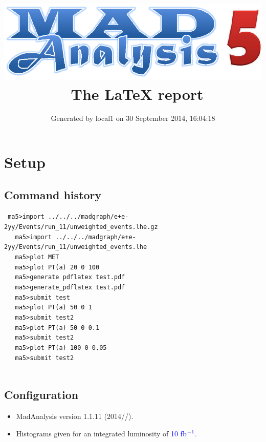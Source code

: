 \documentclass[a4paper, 11pt]{article}
\title{{\includegraphics[scale=.4]{logo.eps}}\ The LaTeX report}
\author{Generated by local1 on 30 September 2014, 16:04:18}
\begin{document}
\maketitle
\flushbottom

\newpage
\section{ Setup}

\subsection{ Command history}

\texttt{ ma5>import ../\-../\-../\-madgraph/\-e+e-2yy/\-Events/\-run\_11/\-unweighted\_events.lhe.gz\\
}
\texttt{ }\texttt{ }\texttt{ ma5>import ../\-../\-../\-madgraph/\-e+e-2yy/\-Events/\-run\_11/\-unweighted\_events.lhe\\
}
\texttt{ }\texttt{ }\texttt{ ma5>plot MET\\
}
\texttt{ }\texttt{ }\texttt{ ma5>plot PT(a) 20 0 100\\
}
\texttt{ }\texttt{ }\texttt{ ma5>generate pdflatex test.pdf\\
}
\texttt{ }\texttt{ }\texttt{ ma5>generate\_pdflatex test.pdf\\
}
\texttt{ }\texttt{ }\texttt{ ma5>submit test\\
}
\texttt{ }\texttt{ }\texttt{ ma5>plot PT(a) 50 0 1\\
}
\texttt{ }\texttt{ }\texttt{ ma5>submit test2\\
}
\texttt{ }\texttt{ }\texttt{ ma5>plot PT(a) 50 0 0.1\\
}
\texttt{ }\texttt{ }\texttt{ ma5>submit test2\\
}
\texttt{ }\texttt{ }\texttt{ ma5>plot PT(a) 100 0 0.05\\
}
\texttt{ }\texttt{ }\texttt{ ma5>submit test2\\
}
\texttt{ }\texttt{ }\subsection{ Configuration}

\begin{itemize}
  \item MadAnalysis version 1.1.11 (2014//).
   \item Histograms given for an integrated luminosity of \textcolor{blue}{10}\textcolor{blue}{ fb}$^{\textcolor{blue}{-1}}$\textcolor{blue}{.}
\textcolor{blue}{}
\end{itemize}
\newpage
\end{document}
